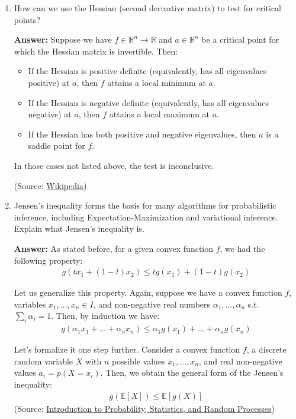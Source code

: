 \documentclass{article}
\newenvironment{QandA}{\begin{enumerate}[label=\arabic*.]}{\end{enumerate}}
\newenvironment{answer}{\par\normalfont \textbf{Answer:}}{}
\newcommand{\R}{\mathbb{R}}
\newcommand{\Exp}[1]{\mathbb{E}\left[ #1 \right]}
\begin{document}
\begin{QandA}
    \item How can we use the Hessian (second derivative matrix) to test for critical points?
    \begin{answer}
        Suppose we have $f \in \R^n \rightarrow \R$ and $a \in \R^n$ be a critical point for which the Hessian matrix is invertible. Then:
        \begin{itemize}
            \item If the Hessian is positive definite (equivalently, has all eigenvalues positive) at $a$, then $f$ attains a local minimum at $a$. 
            \item If the Hessian is negative definite (equivalently, has all eigenvalues negative) at $a$, then $f$ attains a local maximum at $a$.
            \item If the Hessian has both positive and negative eigenvalues, then $a$ is a saddle point for $f$.
        \end{itemize}
        In those cases not listed above, the test is inconclusive. 
        
        (Source: \href{https://en.wikipedia.org/wiki/Second_partial_derivative_test}{Wikipedia})
    \end{answer}

    \item Jensen’s inequality forms the basis for many algorithms for probabilistic inference, including Expectation-Maximization and variational inference. Explain what Jensen’s inequality is.
    \begin{answer}
        As stated before, for a given convex function $f$, we had the following property: 
        \begin{align*}
            g(tx_1 + (1-t)x_2) \le tg(x_1) + (1-t)g(x_2)
        \end{align*}

        Let us generalize this property. Again, suppose we have a convex function $f$, variables $x_1, \ldots, x_n \in I$, and non-negative real numbers $\alpha_1, \ldots, \alpha_n$ s.t. $\sum_i \alpha_i = 1$. Then, by induction we have:
        \begin{align*}
            g(\alpha_1 x_1 + \ldots + \alpha_n x_n) \le \alpha_1 g(x_1) + \ldots + \alpha_n g(x_n)
        \end{align*}

        Let's formalize it one step further. Consider a convex function $f$, a discrete random variable $X$ with $n$ possible values $x_1, \ldots, x_n$, and real non-negative values $a_i = p(X=x_i)$. Then, we  obtain the general form of the Jensen's inequality:
        \begin{align*}
            g(\Exp{X}) \le \Exp{g(X)}
        \end{align*}
        (Source: \href{https://www.probabilitycourse.com/chapter6/6_2_5_jensen's_inequality.php}{Introduction to Probability, Statistics, and Random Processes})
    \end{answer}


\end{QandA}
\end{document}
